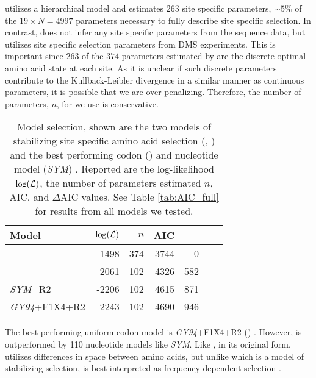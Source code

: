 \selac utilizes a hierarchical model and estimates 263 site specific parameters, $\sim5\%$ of the $19\times N = 4997$ parameters necessary to fully describe site specific selection.
In contrast, \phydms does not infer any site specific parameters from the sequence data, but utilizes site specific selection parameters from DMS experiments.
This is important since $263$ of the $374$ parameters estimated by \selac are the discrete optimal amino acid state at each site. 
As it is unclear if such discrete parameters contribute to the Kullback-Leibler divergence in a similar manner as continuous parameters, it is possible that we are over penalizing.
Therefore, the number of parameters, $n$, for \selac we use is conservative.

\begin{table}
  \centering
  \caption{Model selection, shown are the two models of stabilizing site specific amino acid selection (\selac, \phydms) and the best performing codon (\gy) and nucleotide model  (\emph{SYM}) \citep{GoldmanAndYang1994, zharkikh1994}. 
  Reported are the log-likelihood $\log(\mathcal{L})$, the number of parameters estimated $n$, AIC, and $\Delta$AIC values.
  See Table \ref{tab:AIC_full} for results from all models we tested.
}  
  \begin{tabular}{lrrrrrr}
    \hline
    Model							& $\log(\mathcal{L})$ & $n$ & AIC & \DeltaAIC \\ \hline 
    \selac							& -1498 & 374 & 3744 &  0 \\
    \phydms 						& -2061 & 102 & 4326 & 582 \\
    \emph{SYM}+R2 				& -2206 & 102 & 4615 & 871 \\
    \emph{GY94}+F1X4+R2 		& -2243 & 102 & 4690 & 946 \\ \hline
  \end{tabular}
  \label{tab:AIC_selac}
\end{table}


The best performing uniform codon model is \emph{GY94}+F1X4+R2 (\gy) \citep{GoldmanAndYang1994}. 
However, \gy is outperformed by 110 nucleotide models like \emph{SYM}.
Like \selac, \gy in its original form, utilizes differences in \PC space between amino acids, but unlike \selac which is a model of stabilizing selection, \gy is best interpreted as frequency dependent selection \citep{HughesAndNei1988,Nowak2006,Hughes2007,beaulieu2019}.

